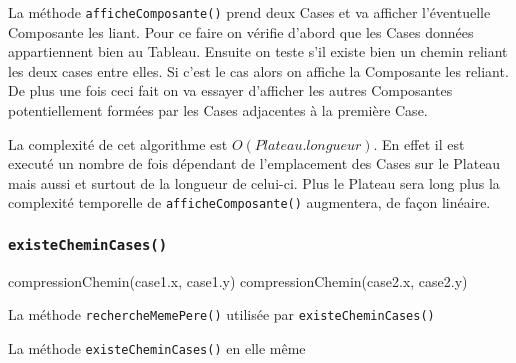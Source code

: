 \documentclass{article}
\newcommand{\info}{\texttt}
\begin{document}
                La méthode \info{afficheComposante()} prend deux Cases et va afficher l'éventuelle Composante les liant. Pour ce faire on vérifie d'abord que les Cases données appartiennent bien au Tableau. Ensuite on teste s'il existe bien un chemin reliant les deux cases entre elles. Si c'est le cas alors on affiche la Composante les reliant. De plus une fois ceci fait on va essayer d'afficher les autres Composantes potentiellement formées par les Cases adjacentes à la première Case.
                
                
                La complexité de cet algorithme est $O(Plateau.longueur)$. En effet il est executé un nombre de fois dépendant de l'emplacement des Cases sur le Plateau mais aussi et surtout de la longueur de celui-ci. Plus le Plateau sera long plus la complexité temporelle de \info{afficheComposante()} augmentera, de façon linéaire.
                
                
            \subsubsection{\info{existeCheminCases()}}
            
                \begin{algorithm}[H]
                compressionChemin(case1.x, case1.y)\;
                compressionChemin(case2.x, case2.y)\;
                \caption{La méthode \info{rechercheMemePere()} utilisée par \info{existeCheminCases()}}
                \end{algorithm}
                
                \begin{algorithm}[H]
                \caption{La méthode \info{existeCheminCases()} en elle même}
                \end{algorithm}
                
\end{document}
